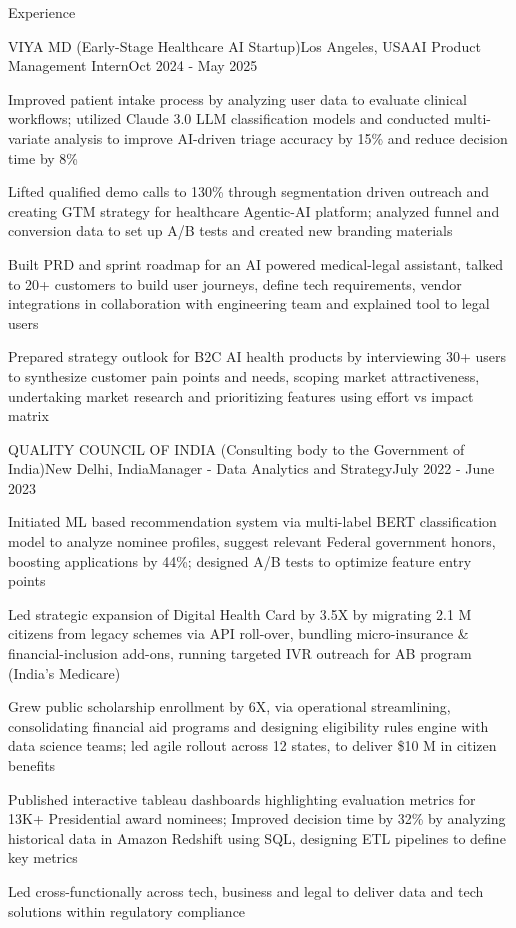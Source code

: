 \documentclass{resume} %
\begin{document}
\begin{rSection}{Experience}
\begin{rSubsection}{VIYA MD (Early-Stage Healthcare AI Startup)}{Los Angeles, USA}{AI Product Management Intern}{Oct 2024 - May 2025}
\item Improved patient intake process by analyzing user data to evaluate clinical workflows; utilized Claude 3.0 LLM classification models and conducted multi-variate analysis to improve AI-driven triage accuracy by 15\% and reduce decision time by 8\%
\item Lifted qualified demo calls to 130\% through segmentation driven outreach and creating GTM strategy for healthcare Agentic-AI platform; analyzed funnel and conversion data to set up A/B tests and created new branding materials
\item Built PRD and sprint roadmap for an AI powered medical-legal assistant, talked to 20+ customers to build user journeys, define tech requirements, vendor integrations in collaboration with engineering team and explained tool to legal users
\item Prepared strategy outlook for B2C AI health products by interviewing 30+ users to synthesize customer pain points and needs, scoping market attractiveness, undertaking market research and prioritizing features using effort vs impact matrix
\end{rSubsection}

\begin{rSubsection}{QUALITY COUNCIL OF INDIA (Consulting body to the Government of India)}{New Delhi, India}{Manager - Data Analytics and Strategy}{July 2022 - June 2023}
\item Initiated ML based recommendation system via multi-label BERT classification model to analyze nominee profiles, suggest relevant Federal government honors, boosting applications by 44\%; designed A/B tests to optimize feature entry points
\item Led strategic expansion of Digital Health Card by 3.5X by migrating 2.1 M citizens from legacy schemes via API roll-over, bundling micro-insurance \& financial-inclusion add-ons, running targeted IVR outreach for AB program (India's Medicare)
\item Grew public scholarship enrollment by 6X, via operational streamlining, consolidating financial aid programs and designing eligibility rules engine with data science teams; led agile rollout across 12 states, to deliver \$10 M in citizen benefits
\item Published interactive tableau dashboards highlighting evaluation metrics for 13K+ Presidential award nominees; Improved decision time by 32\% by analyzing historical data in Amazon Redshift using SQL, designing ETL pipelines to define key metrics
\item Led cross-functionally across tech, business and legal to deliver data and tech solutions within regulatory compliance
\end{rSubsection}


\end{rSection}
\end{document}
